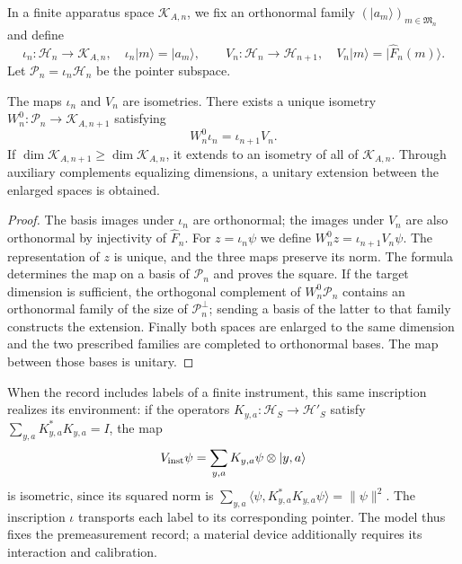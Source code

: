 In a finite apparatus space \(\mathcal K_{A,n}\), we fix an
orthonormal family \((|a_m\rangle)_{m\in\mathfrak M_n}\) and define
\[
 \iota_n:\mathcal H_n\longrightarrow\mathcal K_{A,n},
 \quad \iota_n|m\rangle=|a_m\rangle,
 \qquad
 V_n:\mathcal H_n\longrightarrow\mathcal H_{n+1},
 \quad V_n|m\rangle=|\widehat F_n(m)\rangle.
\]
Let \(\mathcal P_n=\iota_n\mathcal H_n\) be the pointer subspace.

\begin{theorem}
\label{vii:vii:thm:observador-entrelazador}
The maps \(\iota_n\) and \(V_n\) are isometries. There exists a unique
isometry \(W_n^0:\mathcal P_n\longrightarrow\mathcal K_{A,n+1}\)
satisfying
\begin{equation}
 W_n^0\iota_n=\iota_{n+1}V_n.
 \label{vii:vii:eq:observador-cuadrado}
\end{equation}
If \(\dim\mathcal K_{A,n+1}\geq\dim\mathcal K_{A,n}\),
it extends to an isometry of all of \(\mathcal K_{A,n}\).
Through auxiliary complements equalizing dimensions, a unitary
extension between the enlarged spaces is obtained.
\end{theorem}

\begin{proof}
The basis images under \(\iota_n\) are orthonormal; the
images under \(V_n\) are also orthonormal by injectivity of
\(\widehat F_n\). For \(z=\iota_n\psi\) we define
\(W_n^0z=\iota_{n+1}V_n\psi\). The representation of \(z\) is unique,
and the three maps preserve its norm. The formula determines the map on
a basis of \(\mathcal P_n\) and proves the square.
If the target dimension is sufficient, the orthogonal complement of
\(W_n^0\mathcal P_n\) contains an orthonormal family of the size of
\(\mathcal P_n^\perp\); sending a basis of the latter to that family
constructs the extension. Finally both spaces are enlarged to
the same dimension and the two prescribed families are completed to orthonormal
bases. The map between those bases is unitary.
\end{proof}

When the record includes labels of a finite instrument, this same
inscription realizes its environment: if the operators
\(K_{y,a}:\mathcal H_S\to\mathcal H'_S\) satisfy
\(\sum_{y,a}K_{y,a}^*K_{y,a}=I\), the map
\[
 V_{\rm inst}\psi=\sum_{y,a}K_{y,a}\psi\otimes|y,a\rangle
\]
is isometric, since its squared norm is
\(\sum_{y,a}\langle\psi,K_{y,a}^*K_{y,a}\psi\rangle=\|\psi\|^2\).
The inscription \(\iota\) transports each label to its corresponding
pointer. The model thus fixes the premeasurement record; a
material device additionally requires its interaction and calibration.

